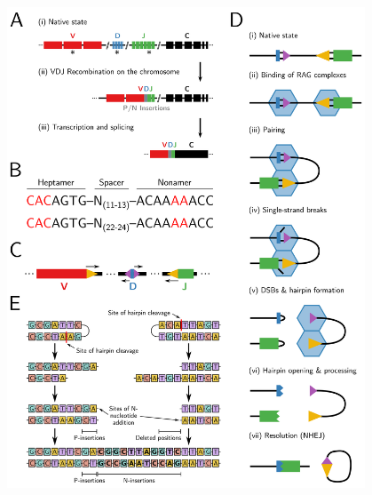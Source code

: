 \begin{figure}
\centering
\includegraphics[width=0.95\textwidth]{_Figures/png_edited/primary-diversity}
\begin{subfigure}{0em}
\label{fig:intro-vdjr-locus}
\end{subfigure}
\begin{subfigure}{0em}
\label{fig:intro-vdjr-consensus}
\end{subfigure}
\begin{subfigure}{0em}
\label{fig:intro-vdjr-rss}
\end{subfigure}
\begin{subfigure}{0em}
\label{fig:intro-vdjr-mechanism}
\end{subfigure}
\begin{subfigure}{0em}
\label{fig:intro-vdjr-junctions}
\end{subfigure}

\end{figure}
